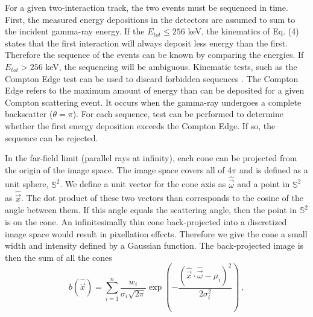 \documentclass[10pt]{article}
\begin{document}
For a given two-interaction track, the two events must be sequenced in time. First, the measured energy depositions in the detectors are assumed to sum to the incident gamma-ray energy. If the $E_{tot} \leq 256$ keV, the kinematics of Eq. (4) states that the first interaction will always deposit less energy than the first. Therefore the sequence of the events can be known by comparing the energies. If $E_{tot} > 256$ keV, the sequencing will be ambiguous. Kinematic tests, such as the Compton Edge test can be used to discard forbidden sequences \cite{Lehner2004}. The Compton Edge refers to the maximum amount of energy than can be deposited for a given Compton scattering event. It occurs when the gamma-ray undergoes a complete backscatter ($\theta = \pi$). For each sequence, test can be performed to determine whether the first energy deposition exceeds the Compton Edge. If so, the sequence can be rejected. 

In the far-field limit (parallel rays at infinity), each cone can be projected from the origin of the image space. The image space covers all of 4$\pi$ and is defined as a unit sphere, $\mathbb{S}^2$. We define a unit vector for the cone axis as $\hat{\vec{\omega}}$ and a point in $\mathbb{S}^2$ as $\hat{\vec{x}}$. The dot product of these two vectors than corresponds to the cosine of the angle between them. If this angle equals the scattering angle, then the point in $\mathbb{S}^2$ is on the cone. An infinitesimally thin cone back-projected into a discretized image space would result in pixellation effects. Therefore we give the cone a small width and intensity defined by a Gaussian function. The back-projected image is then the sum of all the cones
%
\begin{equation}
b(\hat{\vec{x}}) = \sum_{i=1}^n \frac{w_i}{\sigma_i \sqrt{2\pi}} \exp\left( -\frac{(\hat{\vec{x}} \cdot \hat{\vec{\omega}} - \mu_i)^2}{2\sigma_i^2} \right)\,,
\end{equation}
\end{document}
